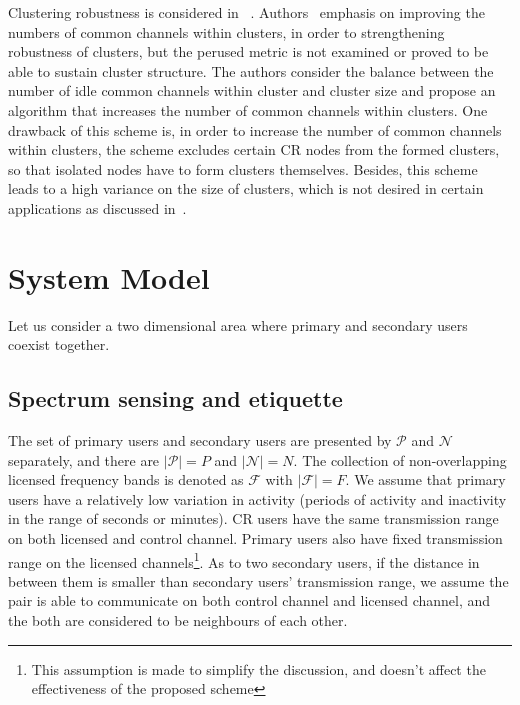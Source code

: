 Clustering robustness is considered in ~\cite{Lazos09, LIU_TMC11_2}.
Authors~\cite{Lazos09, LIU_TMC11_2} emphasis on improving the numbers of common channels within clusters,   in order to strengthening robustness of clusters, but the perused metric is not examined or proved to be able to sustain cluster structure.
The authors consider the balance between the number of idle common channels within cluster and cluster size and propose an algorithm that increases the number of common channels within clusters. 
One drawback of this scheme is, in order to increase the number of common channels within clusters, the scheme excludes certain CR nodes from the formed clusters, so that isolated nodes have to form clusters themselves. 
Besides, this scheme leads to a high variance on the size of clusters, which is not desired in certain applications as discussed in~\cite{clustering_globecom11, cluster_EW10}.



\section{System Model}
\label{sec:model}
Let us consider a two dimensional area where primary and secondary users coexist together.
\subsection*{Spectrum sensing and etiquette}

The set of primary users and secondary users are presented by $\mathcal{P}$ and $\mathcal{N}$ separately, and there are $|\mathcal{P}| = P$ and $|\mathcal{N}| = N$.
The collection of non-overlapping licensed frequency bands is denoted as $\mathcal{F}$ with $|\mathcal{F}| =F$.
We assume that primary users have a relatively low variation in activity (periods of activity and inactivity in the range of seconds or minutes).
CR users have the same transmission range on both licensed and control channel.
Primary users also have fixed transmission range on the licensed channels\footnote{This assumption is made to simplify the discussion, and doesn't affect the effectiveness of the proposed scheme}.
As to two secondary users, if the distance in between them is smaller than secondary users' transmission range, we assume the pair is able to communicate on both control channel and licensed channel, and the both are considered to be neighbours of each other.


